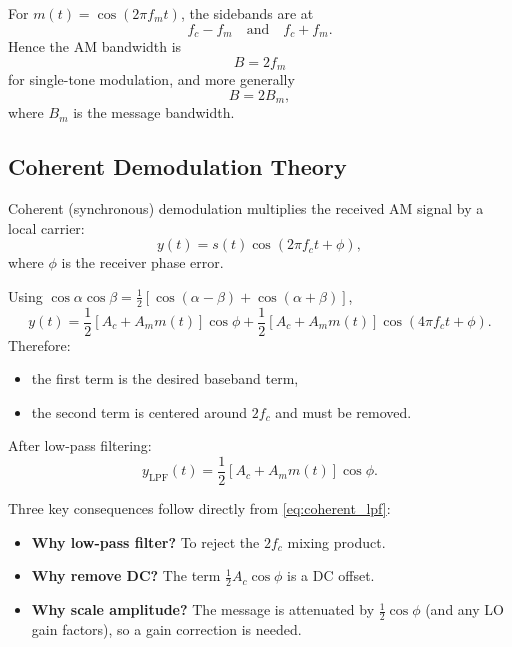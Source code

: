 For $m(t)=\cos(2\pi f_m t)$, the sidebands are at
\begin{equation}
f_c-f_m \quad \text{and} \quad f_c+f_m.
\end{equation}
Hence the AM bandwidth is
\begin{equation}
B=2f_m
\end{equation}
for single-tone modulation, and more generally
\begin{equation}
B=2B_m,
\end{equation}
where $B_m$ is the message bandwidth.

\subsection{Coherent Demodulation Theory}
Coherent (synchronous) demodulation multiplies the received AM signal by a local carrier:
\begin{equation}
y(t)=s(t)\cos(2\pi f_c t+\phi),
\label{eq:coherent_multiply}
\end{equation}
where $\phi$ is the receiver phase error.

Using $\cos\alpha\cos\beta=\tfrac{1}{2}[\cos(\alpha-\beta)+\cos(\alpha+\beta)]$,
\begin{equation}
y(t)=\frac{1}{2}\left[A_c+A_m m(t)\right]\cos\phi
+\frac{1}{2}\left[A_c+A_m m(t)\right]\cos(4\pi f_c t+\phi).
\label{eq:coherent_expand}
\end{equation}
Therefore:
\begin{itemize}
\item the first term is the desired baseband term,
\item the second term is centered around $2f_c$ and must be removed.
\end{itemize}

After low-pass filtering:
\begin{equation}
y_{\mathrm{LPF}}(t)=\frac{1}{2}\left[A_c+A_m m(t)\right]\cos\phi.
\label{eq:coherent_lpf}
\end{equation}

Three key consequences follow directly from \eqref{eq:coherent_lpf}:
\begin{itemize}
\item \textbf{Why low-pass filter?} To reject the $2f_c$ mixing product.
\item \textbf{Why remove DC?} The term $\tfrac{1}{2}A_c\cos\phi$ is a DC offset.
\item \textbf{Why scale amplitude?} The message is attenuated by $\tfrac{1}{2}\cos\phi$ (and any LO gain factors), so a gain correction is needed.
\end{itemize}

